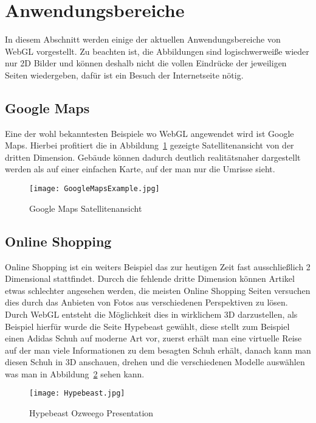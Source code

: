 \section{Anwendungsbereiche}
In diesem Abschnitt werden einige der aktuellen Anwendungsbereiche von WebGL vorgestellt.
Zu beachten ist, die Abbildungen sind logischwerweiße wieder nur 2D Bilder und können deshalb nicht die vollen Eindrücke der jeweiligen Seiten wiedergeben, dafür ist ein Besuch der Internetseite nötig.
\subsection{Google Maps}
Eine der wohl bekanntesten Beispiele wo WebGL angewendet wird ist Google Maps.
Hierbei profitiert die in Abbildung~\ref{fig:GoogleMaps} gezeigte Satellitenansicht von der dritten Dimension.
Gebäude können dadurch deutlich realitätsnaher dargestellt werden als auf einer einfachen Karte, auf der man nur die Umrisse sieht.
\begin{figure}
    \centering
    \texttt{[image: GoogleMapsExample.jpg]}
    \caption{Google Maps Satellitenansicht \cite{GoogleMaps}} \label{fig:GoogleMaps}
    \end{figure}

\subsection{Online Shopping}
Online Shopping ist ein weiters Beispiel das zur heutigen Zeit fast ausschließlich 2 Dimensional stattfindet.
Durcch die fehlende dritte Dimension können Artikel etwas schlechter angesehen werden, die meisten Online Shopping Seiten versuchen dies durch das Anbieten von Fotos aus verschiedenen Perspektiven zu lösen.
Durch WebGL entsteht die Möglichkeit dies in wirklichem 3D darzustellen, als Beispiel hierfür wurde die Seite Hypebeast gewählt, diese stellt zum Beispiel einen Adidas Schuh auf moderne Art vor, zuerst erhält man eine virtuelle Reise auf der man viele Informationen zu dem besagten Schuh erhält, danach kann man diesen Schuh in 3D anschauen, drehen und die verschiedenen Modelle auswählen was man in Abbildung~\ref{fig:HypeBeast} sehen kann.
\begin{figure}
    \centering
    \texttt{[image: Hypebeast.jpg]}
    \caption{Hypebeast Ozweego Presentation \cite{hypbeast}} \label{fig:HypeBeast}
    \end{figure}

